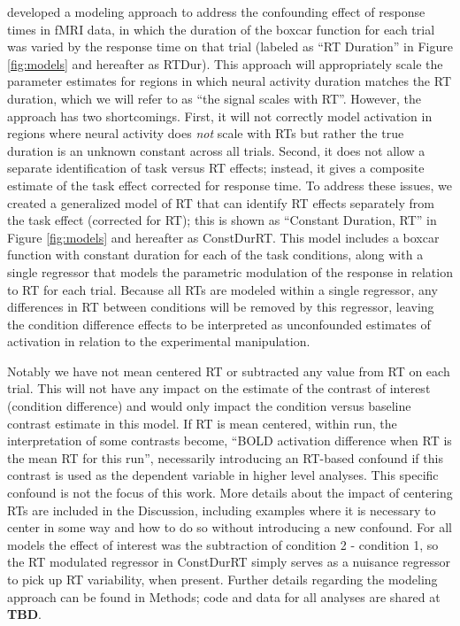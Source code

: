 \documentclass[titlepage,12pt] {article}
\begin{document}
\citet{grinband_detection_2008} developed a modeling approach to address the confounding effect of response times in fMRI data, in which the duration of the boxcar function for each trial was varied by the response time on that trial (labeled as ``RT Duration'' in Figure \ref{fig:models} and hereafter as RTDur).  This approach will appropriately scale the parameter estimates for regions in which neural activity duration matches the RT duration, which we will refer to as ``the signal scales with RT''. However, the approach has two shortcomings. First, it will not correctly model activation in regions where neural activity does \textit{not} scale with RTs but rather the true duration is an unknown constant across all trials.  Second, it does not allow a separate identification of task versus RT effects; instead, it gives a composite estimate of the task effect corrected for response time.  To address these issues, we created a generalized model of RT that can identify RT effects separately from the task effect (corrected for RT); this is shown as ``Constant Duration, RT'' in Figure \ref{fig:models} and hereafter as ConstDurRT.  This model includes a boxcar function with constant duration for each of the task conditions, along with a single regressor that models the parametric modulation of the response in relation to RT for each trial. Because all RTs are modeled within a single regressor, any differences in RT between conditions will be removed by this regressor, leaving the condition difference effects to be interpreted as unconfounded estimates of activation in relation to the experimental manipulation.

Notably we have not mean centered RT or subtracted any value from RT on each trial.  This will not have any impact on the estimate of the contrast of interest (condition difference) and would only impact the condition versus baseline contrast estimate in this model.  If RT is mean centered, within run, the interpretation of some contrasts become, ``BOLD activation difference when RT is the mean RT for this run'', necessarily introducing an RT-based confound if this contrast is used as the dependent variable in higher level analyses.  This specific confound is not the focus of this work.  More details about the impact of centering RTs are included in the Discussion, including examples where it is necessary to center in some way and how to do so without introducing a new confound. For all models the effect of interest was the subtraction of condition 2 - condition 1, so the RT modulated regressor in ConstDurRT simply serves as a nuisance regressor to pick up RT variability, when present. Further details regarding the modeling approach can be found in Methods; code and data for all analyses are shared at \textbf{TBD}.
\end{document}
